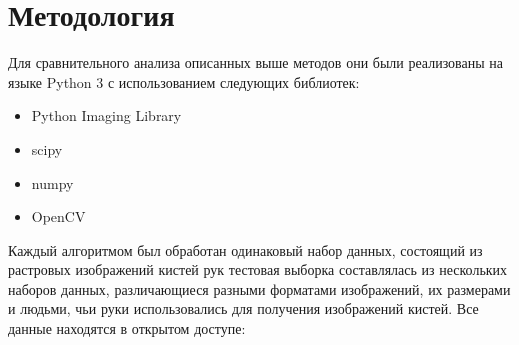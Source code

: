 \section{Методология}
\label{sec:Method}

Для сравнительного анализа описанных выше методов они были реализованы на языке Python 3 с использованием следующих библиотек:

\begin{itemize}
	\item Python Imaging Library
	\item scipy
	\item numpy
	\item OpenCV
\end{itemize} 

Каждый алгоритмом был обработан одинаковый набор данных, состоящий из растровых изображений кистей рук тестовая выборка составлялась из нескольких наборов данных, различающиеся разными форматами изображений, их размерами и людьми, чьи руки использовались для получения изображений кистей. Все данные находятся в открытом доступе:

